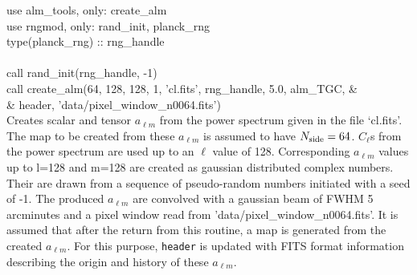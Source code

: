 \begin{example}
{
use alm\_tools, only: create\_alm \\
use rngmod, only: rand\_init, planck\_rng \\
type(planck\_rng) :: rng\_handle \\
\\
call rand\_init(rng\_handle, -1) \\
call create\_alm(64, 128, 128, 1, 'cl.fits', rng\_handle, 5.0, alm\_TGC, \&\\
 \&  header, 'data/pixel\_window\_n0064.fits')  \\
}
{
Creates scalar and tensor $a_{\ell m}$ from the power spectrum given in the file
`cl.fits'. The map to be created from these $a_{\ell m}$ is assumed to have
$N_\mathrm{side}=64$. $C_\ell$s from the power spectrum are used up to an $\ell$ value of
128. 
Corresponding $a_{\ell m}$ values up to l=128 and m=128 are created as gaussian distributed
complex numbers. Their are drawn from a sequence of pseudo-random numbers
initiated with a seed of -1. 
The produced $a_{\ell m}$ are convolved with a gaussian beam of FWHM 5 arcminutes
and a pixel window read from 'data/pixel\_window\_n0064.fits'. It is assumed that after the return
from this routine, a map is generated from the created
$a_{\ell m}$. For this purpose, {\tt header} is updated with FITS format information
describing the origin and history of these $a_{\ell m}$.
}
\end{example}


